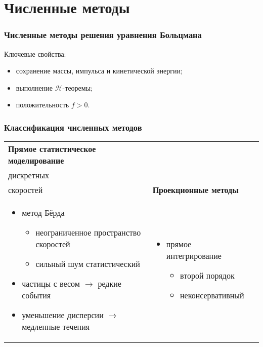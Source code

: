 \documentclass[mathserif]{beamer} %
\newcommand\pro{\item[$+$]}
\newcommand\con{\item[$-$]}
\begin{document}
\section{Численные методы}

\begin{frame}
    \frametitle{Численные методы решения уравнения Больцмана}
    Ключевые свойства:
    \begin{itemize}
        \item сохранение массы, импульса и кинетической энергии;
        \item выполнение \(\mathcal{H}\)-теоремы;
        \item положительность \(f>0\).
    \end{itemize}
\end{frame}

\begin{frame}
    \frametitle{Классификация численных методов}
    \setlength{\leftmarginii}{10pt}
    \setlength{\leftmarginiii}{\leftmarginii}
    \begin{adjustwidth}{-2.5em}{-2.5em}
    \centering
    \newcommand{\ColW}{}
    \begin{tabular}{>{\centering\arraybackslash}p{\ColW}>{\centering\arraybackslash}p{\ColW}>{\centering\arraybackslash}p{\ColW}}
		\centering\bfseries Прямое статистическое моделирование &
		\centering\bfseries {Методы\\дискретных\\скоростей} &
		{\centering\bfseries Проекционные методы} \\
		\begin{itemize}
            \item метод Бёрда
            \begin{itemize}
                \pro неограниченное пространство скоростей
                \con сильный шум статистический
            \end{itemize}
            \item частицы с весом \(\rightarrow\) редкие события
            \item уменьшение дисперсии \(\rightarrow\) медленные течения
        \end{itemize} &
		\begin{itemize}
            \item прямое интегрирование
            \begin{itemize}
                \pro второй порядок
                \con неконсервативный
            \end{itemize}

\end{itemize}
\end{tabular}
\end{adjustwidth}
\end{frame}
\end{document}
